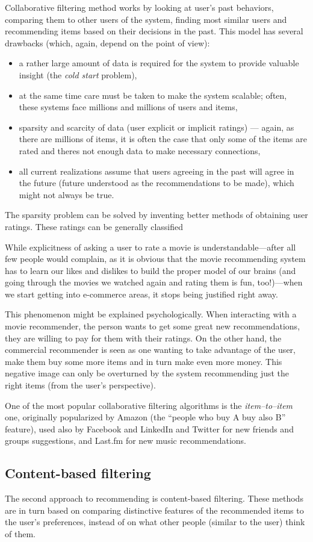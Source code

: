 Collaborative filtering method works by looking at user's past behaviors, comparing them to other users of the system, finding most similar users and recommending items based on their decisions in the past. This model has several drawbacks (which, again, depend on the point of view):

\begin{itemize}
	\item a rather large amount of data is required for the system to provide valuable insight (the \emph{cold start} problem),
	\item at the same time care must be taken to make the system scalable; often, these systems face millions and millions of users and items,
	\item sparsity and scarcity of data (user explicit or implicit ratings) --- again, as there are millions of items, it is often the case that only some of the items are rated and theres not enough data to make necessary connections,
	\item all current realizations assume that users agreeing in the past will agree in the future (future understood as the recommendations to be made), which might not always be true.
\end{itemize}

The sparsity problem can be solved by inventing better methods of obtaining user ratings. These ratings can be generally classified 

While explicitness of asking a user to rate a movie is understandable---after all few people would complain, as it is obvious that the movie recommending system has to learn our likes and dislikes to build the proper model of our brains (and going through the movies we watched again and rating them is fun, too!)---when we start getting into e-commerce areas, it stops being justified right away.

This phenomenon might be explained psychologically. When interacting with a movie recommender, the person wants to get some great new recommendations, they are willing to pay for them with their ratings. On the other hand, the commercial recommender is seen as one wanting to take advantage of the user, make them buy some more items and in turn make even more money. This negative image can only be overturned by the system recommending just the right items (from the user's perspective).

One of the most popular collaborative filtering algorithms is the \emph{item--to--item} one, originally popularized by Amazon (the ``people who buy A buy also B'' feature), used also by Facebook and LinkedIn and Twitter for new friends and groups suggestions, and Last.fm for new music recommendations.

\subsection{Content-based filtering}

The second approach to recommending is content-based filtering. These methods are in turn based on comparing distinctive features of the recommended items to the user's preferences, instead of on what other people (similar to the user) think of them.